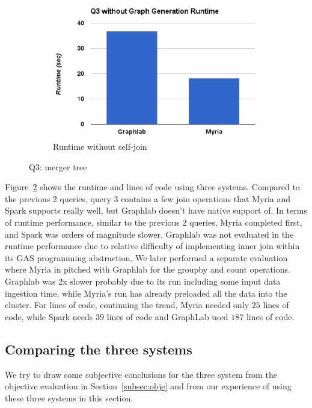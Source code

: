 \begin{figure}[t]
\begin{subfigure}{0.7\linewidth}
      \includegraphics[width=\textwidth]{images/q3_runtime2.png}
      
        \caption{Runtime without self-join}
        \label{fig:q3_runtime2}
        \end{subfigure}

        \label{fig:q3}
\caption{Q3: merger tree}
\end{figure}

Figure~\ref{fig:q3} shows the runtime and lines of code using three systems. Compared to the previous 2 queries, query 3 contains a few join operations that Myria and Spark supports really well, but Graphlab doesn't have native support of. In terms of runtime performance, similar to the previous 2 queries, Myria completed first, and Spark was orders of magnitude slower. Graphlab was not evaluated in the runtime performance due to relative difficulty of implementing inner join within its GAS programming abstraction. We later performed a separate evaluation where Myria in pitched with Graphlab for the groupby and count operations. Graphlab was 2x slower probably due to its run including some input data ingestion time, while Myria's run has already preloaded all the data into the cluster. For lines of code, continuing the trend, Myria needed only $25$ lines of code, while
Spark needs $39$ lines of code and GraphLab used $187$ lines of code.




\subsection{Comparing the three systems}

We try to draw some subjective conclusions for 
the three system from the objective evaluation 
in Section~\ref{subsec:obje} and from our experience of using these three systems in this section.


